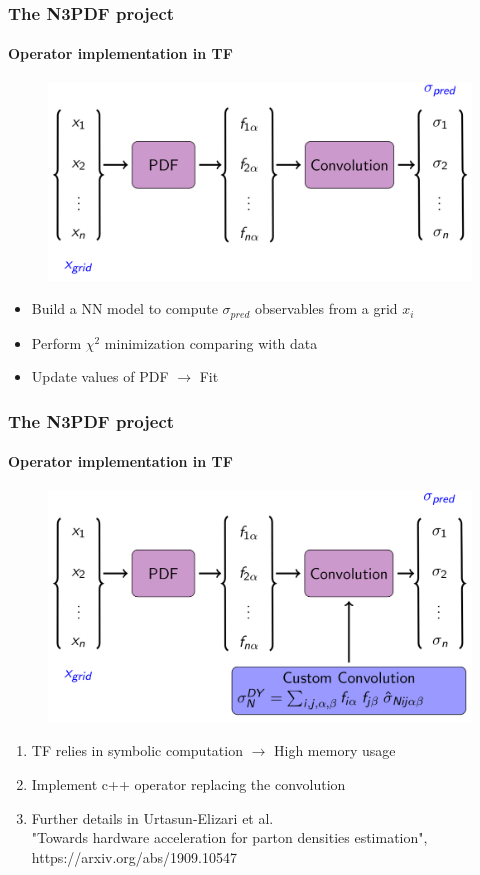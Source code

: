 \documentclass[aspectratio=43]{beamer}
\begin{document}
\begin{frame}

\frametitle{The N3PDF project}
\framesubtitle{Operator implementation in TF}

\begin{figure}
	\includegraphics[width = 8.5 cm]{plots/section2/TF_convolution.png}
\end{figure}


\begin{itemize}
	\item \footnotesize Build a NN model to compute $\sigma_{pred}$ observables from a grid $x_{i}$
	\item \footnotesize Perform $\chi^{2}$ minimization comparing with data
	\item \footnotesize Update values of PDF $\longrightarrow$ {\color{violet} Fit}
\end{itemize}

\end{frame}

\begin{frame}

\frametitle{The N3PDF project}
\framesubtitle{Operator implementation in TF}

\begin{figure}
\includegraphics[width = 8.5 cm]{plots/section2/TF_convolution2.png}
\end{figure}

\begin{enumerate}
\item \footnotesize TF relies in symbolic computation $\longrightarrow$ High memory usage
\item \footnotesize Implement c++ operator replacing the convolution
\item Further details in Urtasun-Elizari et al.\\
{\color{blue}"Towards hardware acceleration for parton densities estimation",\\ https://arxiv.org/abs/1909.10547}
\end{enumerate}

\end{frame}
\end{document}

